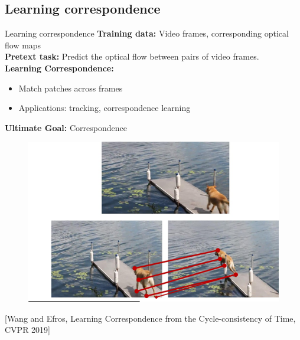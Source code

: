 \subsection{Learning correspondence}
\begin{frame}[allowframebreaks]{Learning correspondence}
    \textbf{Training data:} Video frames, corresponding optical flow maps \\[1em]

    \textbf{Pretext task:} Predict the optical flow between pairs of video frames. \\[1em]
    \textbf{Learning Correspondence:}

    \begin{itemize}
        \item Match patches across frames
        \item Applications: tracking, correspondence learning
    \end{itemize}
\framebreak
    \textbf{Ultimate Goal:} Correspondence
    \begin{figure}
        \centering
        \includegraphics[width=1\textwidth,height=0.7\textheight,keepaspectratio]{images/video/slide_47_1_img.png}
    \end{figure}
    \footnotesize{[Wang and Efros, Learning Correspondence from the Cycle-consistency of Time, CVPR 2019]}
\end{frame}